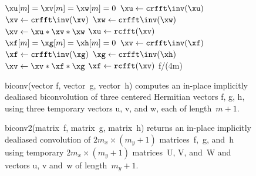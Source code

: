 \documentclass[final]{siamltex}
\begin{document}
\begin{figure}[htbp]
\begin{minipage}{0.445\linewidth}
\begin{function}[H]
  \medskip
  $\xu[m]=\xv[m]=\xw[m]=0$\;
  $\xu \leftarrow \crfft\inv(\xu)$\;
  $\xv \leftarrow \crfft\inv(\xv)$\;
  $\xw \leftarrow \crfft\inv(\xw)$\;
  $\xv \leftarrow \xu * \xv * \xw$\;
  $\xu \leftarrow \rcfft(\xv)$\;
  \medskip
  $\xf[m]=\xg[m]=\xh[m]=0$\;
  $\xv \leftarrow \crfft\inv(\xf)$\;
  $\xf \leftarrow \crfft\inv(\xg)$\;
  $\xg \leftarrow \crfft\inv(\xh)$\;
  $\xv \leftarrow \xv * \xf * \xg$\;
  $\xf \leftarrow \rcfft(\xv)$\;
  \medskip
  \Return f/(4m)\;
\caption{biconv(vector {\sf f}, vector~{\sf g}, vector~{\sf h}) computes
an in-place implicitly dealiased biconvolution of three centered
Hermitian vectors {\sf f}, {\sf g}, {\sf h}, using three temporary vectors
{\sf u}, {\sf v}, and {\sf w}, each of length~$m+1$.}\label{biconv}
\end{function}
\end{minipage}
%
\begin{minipage}{0.5\linewidth}
\begin{function}[H]
  \Return \xf\;
\caption{biconv2(matrix~{\sf f}, matrix~{\sf g}, matrix~{\sf h}) 
returns an in-place implicitly dealiased convolution of \hbox{$2m_x\times
(m_y+1)$} matrices~{\sf f},~{\sf g}, and~{\sf h} using
temporary \hbox{$2m_x\times (m_y+1)$} matrices~{\sf U}, {\sf V}, and~{\sf W} and
vectors {\sf u}, {\sf v} and~{\sf w} of length~$m_y+1$.
}\label{biconv2}
\end{function}
\end{minipage}
\end{figure}
\end{document}
